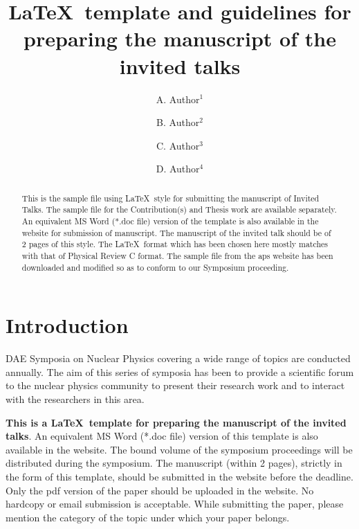 \documentclass[twocolumn,amsmath,amssymb]{snp}
\begin{document}
\title{{\Large \LaTeX\ template and guidelines for preparing the manuscript of the invited talks}}%

\author{\large A. Author$^1$}
\author{\large B. Author$^2$}
\author{\large C. Author$^3$}
\author{\large D. Author$^4$}%
\begin{abstract}
This is the sample file using \LaTeX\ style for submitting the manuscript of Invited Talks. The sample file for the  
Contribution(s) and Thesis work are available separately. An equivalent MS Word (*.doc file) version of the 
template is also available in  the website for submission of manuscript. The manuscript of the invited 
talk should be of 2 pages of this style. The \LaTeX\ format which has been 
chosen here mostly matches with that of Physical Review C format. The sample file from the aps website has 
been downloaded and modified so as to conform to our Symposium proceeding.
\end{abstract}\maketitle


\section{Introduction}
DAE Symposia on Nuclear Physics covering a wide range of topics \cite{poster} are conducted annually. The aim of this series of symposia has been to provide a scientific forum to the nuclear physics community to present their research work and to interact with the researchers in this area. 

{\bf This is a \LaTeX\ template for preparing the manuscript of the invited talks}. 
An equivalent MS Word (*.doc file) version of this template 
is also available in the website.  
The bound volume of the 
symposium proceedings \cite{dae} will be distributed during the symposium. The manuscript (within 2 pages), strictly in the form of this template, should be submitted in the website before the deadline.  Only the pdf version of the paper should be uploaded in the website. No hardcopy or email submission is acceptable. While submitting the paper, please mention the category of the topic under which your paper belongs.
\end{document}
